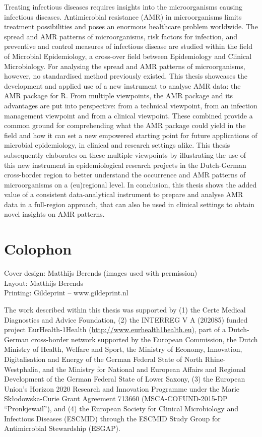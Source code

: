 \documentclass[
]{book}
\begin{document}
Treating infectious diseases requires insights into the microorganisms causing infectious diseases. Antimicrobial resistance (AMR) in microorganisms limits treatment possibilities and poses an enormous healthcare problem worldwide. The spread and AMR patterns of microorganisms, risk factors for infection, and preventive and control measures of infectious disease are studied within the field of Microbial Epidemiology, a cross-over field between Epidemiology and Clinical Microbiology. For analysing the spread and AMR patterns of microorganisms, however, no standardised method previously existed. This thesis showcases the development and applied use of a new instrument to analyse AMR data: the AMR package for R. From multiple viewpoints, the AMR package and its advantages are put into perspective: from a technical viewpoint, from an infection management viewpoint and from a clinical viewpoint. These combined provide a common ground for comprehending what the AMR package could yield in the field and how it can set a new empowered starting point for future applications of microbial epidemiology, in clinical and research settings alike. This thesis subsequently elaborates on these multiple viewpoints by illustrating the use of this new instrument in epidemiological research projects in the Dutch-German cross-border region to better understand the occurrence and AMR patterns of microorganisms on a (eu)regional level. In conclusion, this thesis shows the added value of a consistent data-analytical instrument to prepare and analyse AMR data in a full-region approach, that can also be used in clinical settings to obtain novel insights on AMR patterns.

\hypertarget{colophon}{%
\chapter*{Colophon}\label{colophon}}

Cover design: Matthijs Berends (images used with permission)\\
Layout: Matthijs Berends\\
Printing: Gildeprint -- www.gildeprint.nl

The work described within this thesis was supported by (1) the Certe Medical Diagnostics and Advice Foundation, (2) the INTERREG V A (202085) funded project EurHealth-1Health (\url{http://www.eurhealth1health.eu}), part of a Dutch-German cross-border network supported by the European Commission, the Dutch Ministry of Health, Welfare and Sport, the Ministry of Economy, Innovation, Digitalisation and Energy of the German Federal State of North Rhine-Westphalia, and the Ministry for National and European Affairs and Regional Development of the German Federal State of Lower Saxony, (3) the European Union's Horizon 2020 Research and Innovation Programme under the Marie Skłodowska-Curie Grant Agreement 713660 (MSCA-COFUND-2015-DP ``Pronkjewail''), and (4) the European Society for Clinical Microbiology and Infectious Diseases (ESCMID) through the ESCMID Study Group for Antimicrobial Stewardship (ESGAP).
\end{document}
